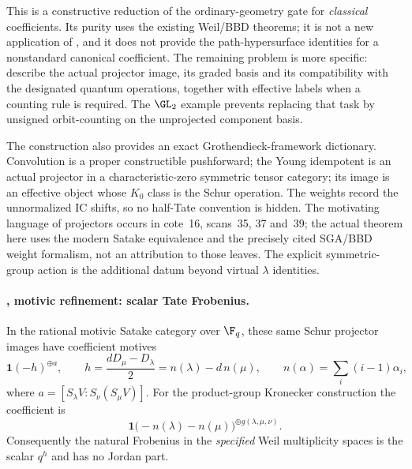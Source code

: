 This is a constructive reduction of the ordinary-geometry gate for \emph{classical} coefficients. Its purity uses the existing Weil/BBD theorems; it is not a new application of , and it does not provide the path-hypersurface identities for a nonstandard canonical coefficient. The remaining problem is more specific: describe the actual projector image, its graded basis and its compatibility with the designated quantum operations, together with effective labels when a counting rule is required. The $\GL_2$ example prevents replacing that task by unsigned orbit-counting on the unprojected component basis.

The construction also provides an exact Grothendieck-framework dictionary. Convolution is a proper constructible pushforward; the Young idempotent is an actual projector in a characteristic-zero symmetric tensor category; its image is an effective object whose $K_0$ class is the Schur operation. The weights record the unnormalized IC shifts, so no half-Tate convention is hidden. The motivating language of projectors occurs in cote~16, scans~35, 37 and~39; the actual theorem here uses the modern Satake equivalence and the precisely cited SGA/BBD weight formalism, not an attribution to those leaves. The explicit symmetric-group action is the additional datum beyond virtual $\lambda$ identities.

\paragraph{, motivic refinement: scalar Tate Frobenius.}
In the rational motivic Satake category over $\F_q$, these same Schur
projector images have coefficient motives
\[
 \mathbf1(-h)^{\oplus a},\qquad
 h=\frac{dD_\mu-D_\lambda}{2}
   =n(\lambda)-d\,n(\mu),\qquad
 n(\alpha)=\sum_i(i-1)\alpha_i,
\]
where $a=[S_\lambda V:S_\nu(S_\mu V)]$. For the product-group Kronecker
construction the coefficient is
\[
 \mathbf1\bigl(-n(\lambda)-n(\mu)\bigr)^{\oplus g(\lambda,\mu,\nu)}.
\]
Consequently the natural Frobenius in the \emph{specified} Weil
multiplicity spaces is the scalar $q^h$ and has no Jordan part.

